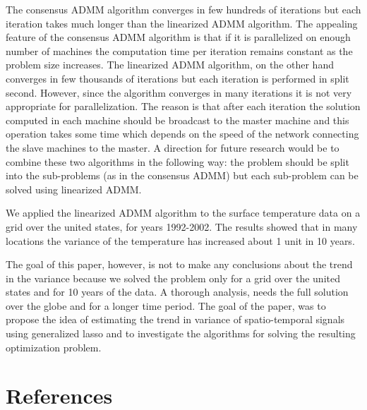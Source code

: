 \documentclass[review]{elsarticle}
\begin{document}
The consensus ADMM algorithm converges in few hundreds of iterations but each iteration takes much longer than the linearized ADMM algorithm. The appealing feature of the consensus ADMM algorithm is that if it is parallelized on enough number of machines the computation time per iteration remains constant as the problem size increases. The linearized ADMM algorithm, on the other hand converges in few thousands of iterations but each iteration is performed in split second. However, since the algorithm converges in many iterations it is not very appropriate for parallelization. The reason is that after each iteration the solution computed in each machine should be broadcast to the master machine and this operation takes some time which depends on the speed of the network connecting the slave machines to the master. A direction for future research would be to combine these two algorithms in the following way: the problem should be split into the sub-problems (as in the consensus ADMM) but each sub-problem can be solved using linearized ADMM.

We applied the linearized ADMM algorithm to the surface temperature data on a grid over the united states, for years 1992-2002. The results showed that in many locations the variance of the temperature has increased about 1 unit in 10 years.

The goal of this paper, however, is not to make any conclusions about the trend in the variance because we solved the problem only for a grid over the united states and for 10 years of the data. A thorough analysis, needs the full solution over the globe and for a longer time period. The goal of the paper, was to propose the idea of estimating the trend in variance of spatio-temporal signals using generalized lasso and to investigate the algorithms for solving the resulting optimization problem.


\section*{References}

\end{document}
